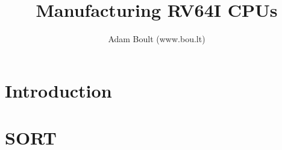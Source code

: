 \documentclass[oneside]{book}
\begin{document}
\author{Adam Boult (www.bou.lt)}
\title{Manufacturing RV64I CPUs}
\maketitle

\setcounter{tocdepth}{0}
\tableofcontents



\part{Introduction}

\part{SORT}

\end{document}
